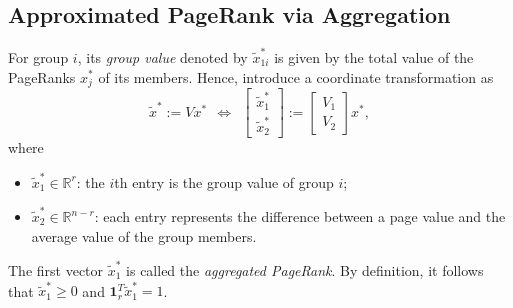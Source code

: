 \documentclass[11pt,draftcls,onecolumn]{IEEEtran}
\newtheorem{assumption}[theorem]{Assumption}
\newcommand{\field}[1]{{\mathbb{#1}}}
\newcommand{\one}{\mathbf{1}}
\newcommand{\R}{\field{R}}
\begin{document}



\subsection*{Approximated PageRank via Aggregation}

For group $i$, its \textit{group value} denoted by $\widetilde{x}_{1i}^*$ 
is given by the total value of the PageRanks $x_j^*$ of its members. 
Hence, introduce a coordinate transformation as
\begin{equation*}
\widetilde{x}^*:=Vx^*
~~\Leftrightarrow~~
     \begin{bmatrix}
        \widetilde{x}_1^*\\
        \widetilde{x}_2^*
     \end{bmatrix}
   := \begin{bmatrix}
         V_1\\ V_2
      \end{bmatrix} x^*,
  \label{eqn:xtilde}
\end{equation*}
where
\begin{itemize}
 \item $\widetilde{x}_1^*\in\R^{r}$: the $i$th entry is the group value of group $i$;
 \item $\widetilde{x}_2^*\in\R^{n-r}$: each entry represents the difference between 
                                   a page value and the average value of the group members.
\end{itemize}
The first vector $\widetilde{x}_1^*$ is called the \textit{aggregated PageRank}.
By definition, it follows that $\widetilde{x}_1^*\geq 0$ and
$\one_r^T\widetilde{x}_1^*=1$.
\end{document}
